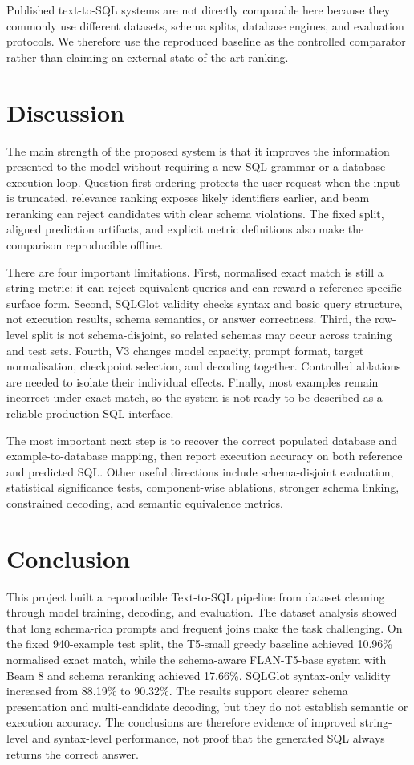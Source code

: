 \documentclass[10pt,a4paper]{article}
\begin{document}
Published text-to-SQL systems are not directly comparable here because they commonly use different datasets, schema splits, database engines, and evaluation protocols. We therefore use the reproduced baseline as the controlled comparator rather than claiming an external state-of-the-art ranking.

\section{Discussion}
The main strength of the proposed system is that it improves the information presented to the model without requiring a new SQL grammar or a database execution loop. Question-first ordering protects the user request when the input is truncated, relevance ranking exposes likely identifiers earlier, and beam reranking can reject candidates with clear schema violations. The fixed split, aligned prediction artifacts, and explicit metric definitions also make the comparison reproducible offline.

There are four important limitations. First, normalised exact match is still a string metric: it can reject equivalent queries and can reward a reference-specific surface form. Second, SQLGlot validity checks syntax and basic query structure, not execution results, schema semantics, or answer correctness. Third, the row-level split is not schema-disjoint, so related schemas may occur across training and test sets. Fourth, V3 changes model capacity, prompt format, target normalisation, checkpoint selection, and decoding together. Controlled ablations are needed to isolate their individual effects. Finally, most examples remain incorrect under exact match, so the system is not ready to be described as a reliable production SQL interface.

The most important next step is to recover the correct populated database and example-to-database mapping, then report execution accuracy on both reference and predicted SQL. Other useful directions include schema-disjoint evaluation, statistical significance tests, component-wise ablations, stronger schema linking, constrained decoding, and semantic equivalence metrics.

\section{Conclusion}
This project built a reproducible Text-to-SQL pipeline from dataset cleaning through model training, decoding, and evaluation. The dataset analysis showed that long schema-rich prompts and frequent joins make the task challenging. On the fixed 940-example test split, the T5-small greedy baseline achieved 10.96\% normalised exact match, while the schema-aware FLAN-T5-base system with Beam 8 and schema reranking achieved 17.66\%. SQLGlot syntax-only validity increased from 88.19\% to 90.32\%. The results support clearer schema presentation and multi-candidate decoding, but they do not establish semantic or execution accuracy. The conclusions are therefore evidence of improved string-level and syntax-level performance, not proof that the generated SQL always returns the correct answer.
\end{document}
